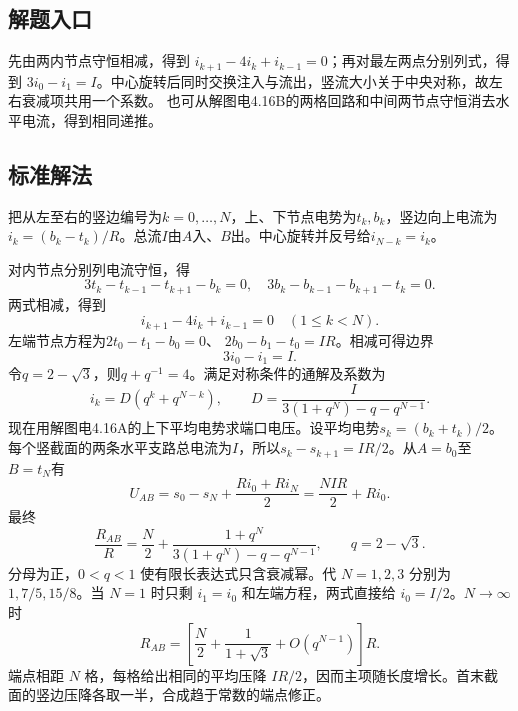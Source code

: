 \documentclass[UTF8,fontset=fandol,a4paper,11pt]{ctexart}
\newcommand{\figcaption}[1]{\par\vspace{2pt}{\small\color{muted}#1}\par}
\begin{document}


\subsection*{解题入口}

先由两内节点守恒相减，得到 $i_{k+1}-4i_k+i_{k-1}=0$；再对最左两点分别列式，得到 $3i_0-i_1=I$。中心旋转后同时交换注入与流出，竖流大小关于中央对称，故左右衰减项共用一个系数。
也可从解图电4.16B的两格回路和中间两节点守恒消去水平电流，得到相同递推。


\subsection*{标准解法}

把从左至右的竖边编号为$k=0,\ldots,N$，上、下节点电势为$t_k,b_k$，竖边向上电流为$i_k=(b_k-t_k)/R$。总流$I$由$A$入、$B$出。中心旋转并反号给$i_{N-k}=i_k$。

\begin{center}\begin{minipage}{.98\linewidth}\centering
{}
\figcaption{解图电4.16A\quad 内节点差方程与平均电势}
\end{minipage}\end{center}

对内节点分别列电流守恒，得
\[
3t_k-t_{k-1}-t_{k+1}-b_k=0,\quad
3b_k-b_{k-1}-b_{k+1}-t_k=0.
\]
两式相减，得到
\[
i_{k+1}-4i_k+i_{k-1}=0\quad(1\le k<N).
\]
左端节点方程为$2t_0-t_1-b_0=0$、
$2b_0-b_1-t_0=IR$。相减可得边界
\[
3i_0-i_1=I.
\]
令$q=2-\sqrt3$，则$q+q^{-1}=4$。满足对称条件的通解及系数为
\[
i_k=D(q^k+q^{N-k}),\qquad
D=\frac{I}{3(1+q^N)-q-q^{N-1}}.
\]
现在用解图电4.16A的上下平均电势求端口电压。设平均电势$s_k=(b_k+t_k)/2$。每个竖截面的两条水平支路总电流为$I$，所以$s_k-s_{k+1}=IR/2$。从$A=b_0$至$B=t_N$有
\[
U_{AB}=s_0-s_N+\frac{Ri_0+Ri_N}{2}
=\frac{NIR}{2}+Ri_0.
\]
最终
\[
\boxed{\frac{R_{AB}}R=\frac N2+
\frac{1+q^N}{3(1+q^N)-q-q^{N-1}},\qquad q=2-\sqrt3.}
\]
分母为正，$0<q<1$ 使有限长表达式只含衰减幂。代 $N=1,2,3$ 分别为 $1,7/5,15/8$。当 $N=1$ 时只剩 $i_1=i_0$ 和左端方程，两式直接给 $i_0=I/2$。$N\to\infty$时
\[
R_{AB}=\left[\frac N2+\frac1{1+\sqrt3}+O(q^{N-1})\right]R.
\]
端点相距 $N$ 格，每格给出相同的平均压降 $IR/2$，因而主项随长度增长。首末截面的竖边压降各取一半，合成趋于常数的端点修正。
\end{document}
